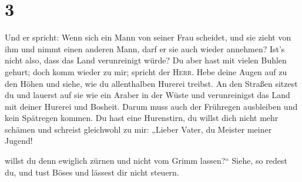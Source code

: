 \hypertarget{section-2}{%
\section{3}\label{section-2}}

 Und er spricht: Wenn sich ein Mann von seiner Frau
scheidet, und sie zieht von ihm und nimmt einen anderen Mann, darf er
sie auch wieder annehmen? Ist's nicht also, dass das Land verunreinigt
würde? Du aber hast mit vielen Buhlen gehurt; doch komm wieder zu mir;
spricht der \textsc{Herr}.  Hebe deine Augen auf zu den
Höhen und siehe, wie du allenthalben Hurerei treibst. An den Straßen
sitzest du und lauerst auf sie wie ein Araber in der Wüste und
verunreinigst das Land mit deiner Hurerei und Bosheit. 
Darum muss auch der Frühregen ausbleiben und kein Spätregen kommen. Du
hast eine Hurenstirn, du willst dich nicht mehr schämen 
und schreist gleichwohl zu mir: „Lieber Vater, du Meister meiner Jugend!

 willst du denn ewiglich zürnen und nicht vom Grimm
lassen?{}`` Siehe, so redest du, und tust Böses und lässest dir nicht
steuern.

